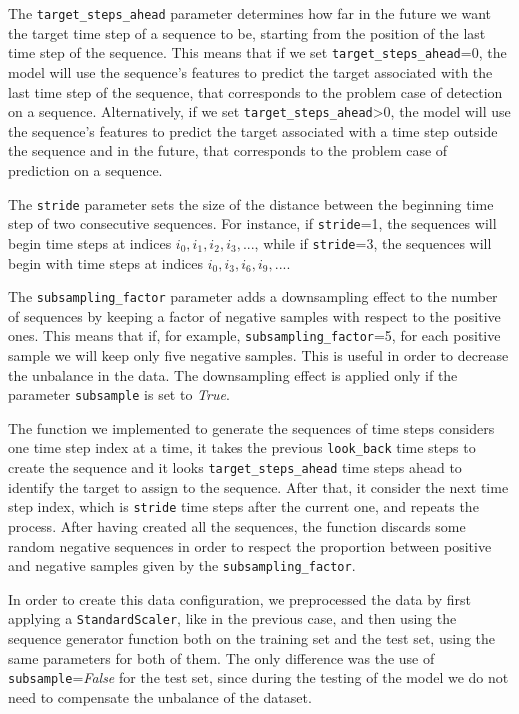 The \texttt{target\_steps\_ahead} parameter determines how far in the future we want the target time step of a sequence to be, starting from the position of the last time step of the sequence. This means that if we set \texttt{target\_steps\_ahead}=0, the model will use the sequence's features to predict the target associated with the last time step of the sequence, that corresponds to the problem case of detection on a sequence. Alternatively, if we set \texttt{target\_steps\_ahead}>0, the model will use the sequence's features to predict the target associated with a time step outside the sequence and in the future, that corresponds to the problem case of prediction on a sequence.

The \texttt{stride} parameter sets the size of the distance between the beginning time step of two consecutive sequences. For instance, if \texttt{stride}=1, the sequences will begin time steps at indices $i_0, i_1, i_2, i_3, ...$, while if \texttt{stride}=3, the sequences will begin with time steps at indices $i_0, i_3, i_6, i_9, ...$.

The \texttt{subsampling\_factor} parameter adds a downsampling effect to the number of sequences by keeping a factor of negative samples with respect to the positive ones. This means that if, for example, \texttt{subsampling\_factor}=5, for each positive sample we will keep only five negative samples. This is useful in order to decrease the unbalance in the data. The downsampling effect is applied only if the parameter \texttt{subsample} is set to \textit{True}.

The function we implemented to generate the sequences of time steps considers one time step index at a time, it takes the previous \texttt{look\_back} time steps to create the sequence and it looks \texttt{target\_steps\_ahead} time steps ahead to identify the target to assign to the sequence. After that, it consider the next time step index, which is \texttt{stride} time steps after the current one, and repeats the process. After having created all the sequences, the function discards some random negative sequences in order to respect the proportion between positive and negative samples given by the \texttt{subsampling\_factor}.

In order to create this data configuration, we preprocessed the data by first applying a \texttt{StandardScaler}, like in the previous case, and then using the sequence generator function both on the training set and the test set, using the same parameters for both of them. The only difference was the use of \texttt{subsample}=\textit{False} for the test set, since during the testing of the model we do not need to compensate the unbalance of the dataset.

